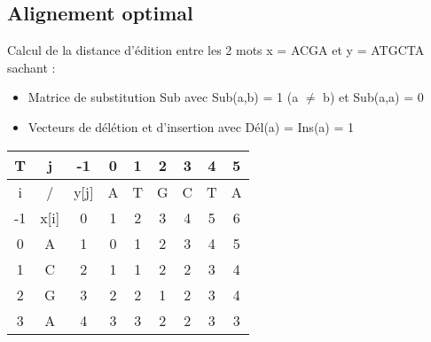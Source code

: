 \documentclass[11pt,a4paper]{article}
\begin{document}
	\subsection{Alignement optimal}

	Calcul de la distance d'édition entre les 2 mots x = ACGA et y = ATGCTA sachant :
	\begin{itemize}
		\item Matrice de substitution Sub avec Sub(a,b) = 1 (a $\neq$ b) et Sub(a,a) = 0
		\item Vecteurs de délétion et d'insertion avec Dél(a) = Ins(a) = 1
	\end{itemize}

	\begin{center}
		\begin{tabular}{|c|c|c|c|c|c|c|c|c|}
			\hline
			T&j&-1&0&1&2&3&4&5\\
			\hline
			i&/&y[j]&A&T&G&C&T&A\\
			\hline
			-1&x[i]&0&1&2&3&4&5&6\\
			\hline
			0&A&1&0&1&2&3&4&5\\
			\hline
			1&C&2&1&1&2&2&3&4\\
			\hline
			2&G&3&2&2&1&2&3&4\\
			\hline
			3&A&4&3&3&2&2&3&3\\
			\hline
		\end{tabular}
	\end{center}
\end{document}
